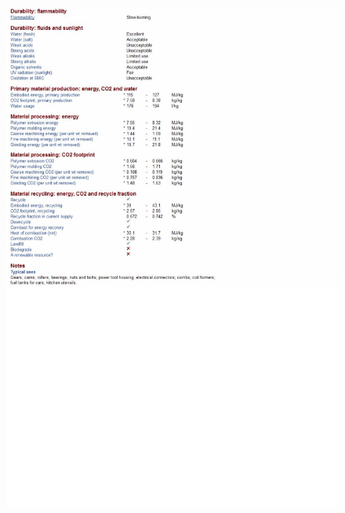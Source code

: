 \begin{figure}[H]
\centering
	\includegraphics[width=\textwidth, height=\textheight]{images/Anexos/PA2}
\end{figure}

